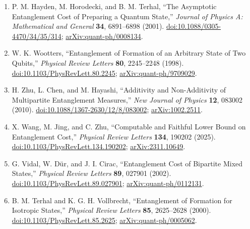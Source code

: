 \begin{enumerate}[label={},leftmargin=4.8em,labelsep=0.5em]
  \footnotesize
  \item[\textup{[HHT01]}]\label{ref:p7-hayden-horodecki-terhal}
  P. M. Hayden, M. Horodecki, and B. M. Terhal,
  ``The Asymptotic Entanglement Cost of Preparing a Quantum State,''
  \emph{Journal of Physics A: Mathematical and General} \textbf{34},
  6891--6898 (2001).
  \href{https://doi.org/10.1088/0305-4470/34/35/314}{doi:10.1088/0305-4470/34/35/314};
  \href{https://arxiv.org/abs/quant-ph/0008134}{arXiv:quant-ph/0008134}.

  \item[\textup{[Woo98]}]\label{ref:p7-wootters}
  W. K. Wootters,
  ``Entanglement of Formation of an Arbitrary State of Two Qubits,''
  \emph{Physical Review Letters} \textbf{80}, 2245--2248 (1998).
  \href{https://doi.org/10.1103/PhysRevLett.80.2245}{doi:10.1103/PhysRevLett.80.2245};
  \href{https://arxiv.org/abs/quant-ph/9709029}{arXiv:quant-ph/9709029}.

  \item[\textup{[ZCH10]}]\label{ref:p7-zhu-chen-hayashi}
  H. Zhu, L. Chen, and M. Hayashi,
  ``Additivity and Non-Additivity of Multipartite Entanglement Measures,''
  \emph{New Journal of Physics} \textbf{12}, 083002 (2010).
  \href{https://doi.org/10.1088/1367-2630/12/8/083002}{doi:10.1088/1367-2630/12/8/083002};
  \href{https://arxiv.org/abs/1002.2511}{arXiv:1002.2511}.

  \item[\textup{[WJZ25]}]\label{ref:p7-wang-jing-zhu}
  X. Wang, M. Jing, and C. Zhu,
  ``Computable and Faithful Lower Bound on Entanglement Cost,''
  \emph{Physical Review Letters} \textbf{134}, 190202 (2025).
  \href{https://doi.org/10.1103/PhysRevLett.134.190202}{doi:10.1103/PhysRevLett.134.190202};
  \href{https://arxiv.org/abs/2311.10649}{arXiv:2311.10649}.

  \item[\textup{[VDC02]}]\label{ref:p7-vidal-dur-cirac}
  G. Vidal, W. D\"ur, and J. I. Cirac,
  ``Entanglement Cost of Bipartite Mixed States,''
  \emph{Physical Review Letters} \textbf{89}, 027901 (2002).
  \href{https://doi.org/10.1103/PhysRevLett.89.027901}{doi:10.1103/PhysRevLett.89.027901};
  \href{https://arxiv.org/abs/quant-ph/0112131}{arXiv:quant-ph/0112131}.

  \item[\textup{[TV00]}]\label{ref:p7-terhal-vollbrecht}
  B. M. Terhal and K. G. H. Vollbrecht,
  ``Entanglement of Formation for Isotropic States,''
  \emph{Physical Review Letters} \textbf{85}, 2625--2628 (2000).
  \href{https://doi.org/10.1103/PhysRevLett.85.2625}{doi:10.1103/PhysRevLett.85.2625};
  \href{https://arxiv.org/abs/quant-ph/0005062}{arXiv:quant-ph/0005062}.


\end{enumerate}

